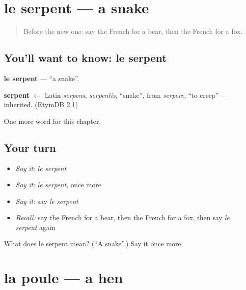 \section[le serpent]{le serpent — a snake}

\label{lesson:FR-C86-serpent}



\begin{quote}
Before the new one: say the French for a bear, then the French for a fox.
\end{quote}

\subsection*{You'll want to know: le serpent}
\textbf{le serpent} — \textquotedblleft{}a snake\textquotedblright{}.

\begin{cousinweb}
\textbf{serpent} $\leftarrow$ Latin \emph{serpens}, \emph{serpentis}, \textquotedblleft{}snake\textquotedblright{}, from \emph{serpere}, \textquotedblleft{}to creep\textquotedblright{} — inherited. (EtymDB 2.1)
\end{cousinweb}

\begin{grammarlens}[title={What you've built}]
One more word for this chapter.
\end{grammarlens}

\subsection*{Your turn}
\begin{itemize}
\raggedright
  \item \emph{Say it:} \emph{le serpent}
  \item \emph{Say it:} \emph{le serpent}, once more
  \item \emph{Say it:} say \emph{le serpent}
  \item \emph{Recall:} say the French for a bear, then the French for a fox, then say \emph{le serpent} again
\end{itemize}

\begin{tcolorbox}[breakable,colback=teal!4,colframe=teal!35!black,title={Before you move on}]
What does le serpent mean? (\textquotedblleft{}A snake\textquotedblright{}.) Say it once more.
\end{tcolorbox}
\section[la poule]{la poule — a hen}

